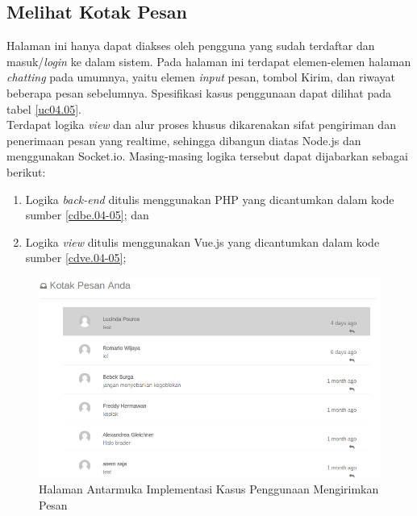 \subsection{Melihat Kotak Pesan}

Halaman ini hanya dapat diakses oleh pengguna yang sudah terdaftar dan masuk/\textit{login} ke dalam sistem. Pada halaman ini terdapat elemen-elemen halaman \textit{chatting} pada umumnya, yaitu elemen \textit{input} pesan, tombol Kirim, dan riwayat beberapa pesan sebelumnya. Spesifikasi kasus penggunaan dapat dilihat pada tabel \ref{uc04.05}.\\
\indent Terdapat logika \textit{view} dan alur proses khusus dikarenakan sifat pengiriman dan penerimaan pesan yang realtime, sehingga dibangun diatas Node.js dan menggunakan Socket.io. Masing-masing logika tersebut dapat dijabarkan sebagai berikut:
\begin{enumerate}
	\item Logika \textit{back-end} ditulis menggunakan PHP yang dicantumkan dalam kode sumber \ref{cdbe.04-05}; dan
	\item Logika \textit{view} ditulis menggunakan Vue.js yang dicantumkan dalam kode sumber \ref{cdve.04-05};
\end{enumerate}

\begin{figure}[H]
	\centering
	\includegraphics[width=\textwidth]{images/bab4/ui/04-05.png}
	\caption{Halaman Antarmuka Implementasi Kasus Penggunaan Mengirimkan Pesan}
	\label{ui.04-05}
\end{figure}

